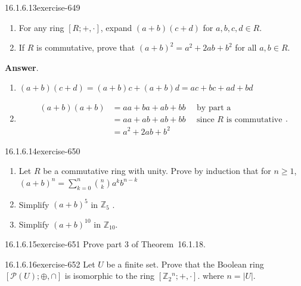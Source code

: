 \documentclass[twoside,10pt,]{book}
\numberwithin{equation}{section}
\begin{document}
\begin{divisionsolution}{16.1.6.13}{}{exercise-649}%
\hypertarget{p-5844}{}%
\leavevmode%
\begin{enumerate}[label=(\alph*)]
\item\hypertarget{li-2587}{}\hypertarget{p-5845}{}%
For any ring \([R; +, \cdot ]\), expand \((a + b)(c + d)\) for \(a, b, c, d \in R\).%
\item\hypertarget{li-2588}{}\hypertarget{p-5846}{}%
If \(R\) is commutative, prove that \((a + b)^2 = a^2 + 2a b + b^2\)  for all \(a, b \in  R\).%
\end{enumerate}
%
\par\smallskip%
\noindent\textbf{Answer}.\quad%
\hypertarget{p-5847}{}%
\leavevmode%
\begin{enumerate}[label=(\alph*)]
\item\hypertarget{li-2589}{}\hypertarget{p-5848}{}%
\((a + b)(c + d) = (a + b)c + (a + b)d  = a c + b c + a d + b d\)%
\item\hypertarget{li-2590}{}\hypertarget{p-5849}{}%
%
\begin{equation*}
\begin{split}
(a + b)(a + b ) &= a a + b a + a b + b b\quad \textrm{       by part a}\\
& =  a a + a b + a b + b b\quad \textrm{      since } R \textrm{ is commutative}\\
& =a^2 + 2a b + b^2
\end{split}\text{.}
\end{equation*}
%
\end{enumerate}
%
\end{divisionsolution}%
\begin{divisionsolution}{16.1.6.14}{}{exercise-650}%
\hypertarget{p-5850}{}%
\leavevmode%
\begin{enumerate}[label=(\alph*)]
\item\hypertarget{li-2591}{}\hypertarget{p-5851}{}%
Let \(R\) be a commutative ring with unity. Prove by induction that for \(n \geq  1\), \((a+b)^n= \sum _{k=0}^n  \binom{n}{k}a^k b^{n-k}\)%
\item\hypertarget{li-2592}{}\hypertarget{p-5852}{}%
Simplify \((a + b)^5\) in \(\mathbb{Z}_5\) .%
\item\hypertarget{li-2593}{}\hypertarget{p-5853}{}%
Simplify \((a + b)^{10}\) in \(\mathbb{Z}_{10}\).%
\end{enumerate}
%
\end{divisionsolution}%
\begin{divisionsolution}{16.1.6.15}{}{exercise-651}%
\hypertarget{p-5854}{}%
Prove part 3 of Theorem~16.1.18.%
\end{divisionsolution}%
\begin{divisionsolution}{16.1.6.16}{}{exercise-652}%
\hypertarget{p-5855}{}%
Let \(U\) be a finite set. Prove that the Boolean ring \([\mathcal{P}(U);\oplus ,\cap ]\) is isomorphic to the ring \(\left[\mathbb{Z}_2{}^n; +, \cdot \right]\). where \(n =\left| U\right|\).%
\end{divisionsolution}%
\end{document}
